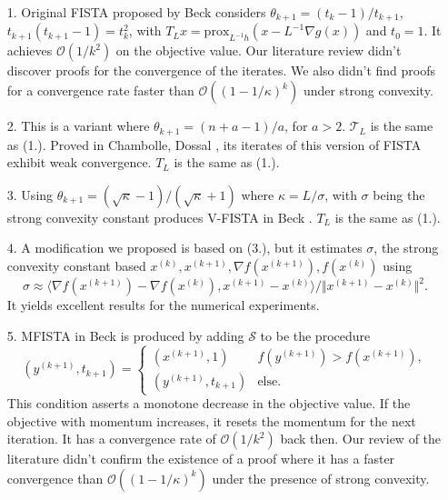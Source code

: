 \documentclass[]{article}
\theoremstyle{definition}
\numberwithin{equation}{subsection}
\begin{document}
        \begin{itemize}
            \item [1.] 
                Original FISTA proposed by Beck \cite{beck_fast_2009-1} considers $\theta_{k + 1} = (t_k - 1)/t_{k + 1}$, $t_{k + 1}(t_{k + 1} - 1) = t_{k}^2$, with $T_L x = \text{prox}_{L^{-1}h}(x  - L^{-1}\nabla g(x))$ and $t_0 = 1$. 
            It achieves $\mathcal O(1/k^2)$ on the objective value. 
            Our literature review didn't discover proofs for the convergence of the iterates. We also didn't find proofs for a convergence rate faster than $\mathcal O((1 - 1/\kappa)^k)$ under strong convexity. 
            \item [2.] 
                This is a variant where $\theta_{k + 1} = (n + a - 1)/a$, for $a > 2$. $\mathcal T_L$ is the same as (1.). 
            Proved in Chambolle, Dossal \cite{chambolle_convergence_2015}, its iterates of this version of FISTA exhibit weak convergence. $T_L$ is the same as (1.). 
            \item [3.] 
                Using $\theta_{k + 1} = (\sqrt{\kappa} - 1)/(\sqrt{\kappa} + 1)$ where $\kappa = L/\sigma$, with $\sigma$ being the strong convexity constant produces V-FISTA in Beck \cite[10.7.7]{beck_first-order_nodate}\cite[3.3]{noel_nesterovs_nodate}. $T_L$ is the same as (1.). 
            \item [4.] 
                A modification we proposed is based on (3.), but it estimates $\sigma$, the strong convexity constant based $x^{(k)}, x^{(k + 1)}, \nabla f(x^{(k + 1)}), f(x^{(k)})$ using 
                \[
                    \sigma \approx \langle \nabla f(x^{(k + 1)}) - \nabla f(x^{(k)}), x^{(k + 1)} - x^{(k)}\rangle/ 
                    \Vert x^{(k + 1)} - x^{(k)}\Vert^2. 
                \]
            It yields excellent results for the numerical experiments. 
            \item [5.] 
                MFISTA in Beck\cite{beck_fast_2009} is produced by adding $\mathcal S$ to be the procedure
                \[
                    (y^{(k + 1)}, t_{k + 1}) = \begin{cases}
                        (x^{(k + 1)}, 1) & f(y^{(k + 1)}) > f(x^{(k + 1)}),
                        \\
                        (y^{(k + 1)}, t_{k + 1}) & \text{else}. 
                    \end{cases}
                \]
                This condition asserts a monotone decrease in the objective value. If the objective with momentum increases, it resets the momentum for the next iteration.  It has a convergence rate of $\mathcal O(1/k^2)$ back then. Our review of the literature didn't confirm the existence of a proof where it has a faster convergence than $\mathcal O((1 - 1/\kappa)^k)$ under the presence of strong convexity. 
        \end{itemize}
\end{document}
